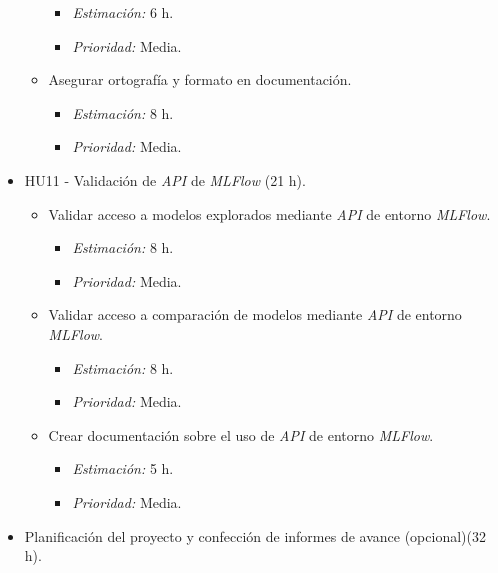 \documentclass[
11pt, %
]{charter}
\begin{document}
\begin{itemize}
\begin{itemize}
                \begin{itemize}
                    \item \textit{Estimación:} 6 h.
                    \item \textit{Prioridad:} Media.
                \end{itemize}
            \item Asegurar ortografía y formato en documentación.
                \begin{itemize}
                    \item \textit{Estimación:} 8 h.
                    \item \textit{Prioridad:} Media.
                \end{itemize}
        \end{itemize}
    \item HU11 - Validación de \textit{API} de \textit{MLFlow} (21 h).
        \begin{itemize}
            \item Validar acceso a modelos explorados mediante \textit{API} de entorno \textit{MLFlow}.
                \begin{itemize}
                    \item \textit{Estimación:} 8 h.
                    \item \textit{Prioridad:} Media.
                \end{itemize}
            \item Validar acceso a comparación de modelos mediante \textit{API} de entorno \textit{MLFlow}.
                \begin{itemize}
                    \item \textit{Estimación:} 8 h.
                    \item \textit{Prioridad:} Media.
                \end{itemize}
            \item Crear documentación sobre el uso de \textit{API} de entorno \textit{MLFlow}.
                \begin{itemize}
                    \item \textit{Estimación:} 5 h.
                    \item \textit{Prioridad:} Media.
                \end{itemize}
        \end{itemize}
    \item Planificación del proyecto y confección de informes de avance (opcional)(32 h).
        \begin{itemize}

\end{itemize}
\end{itemize}
\end{document}
